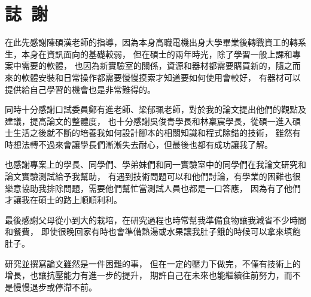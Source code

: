 \chapter*{誌~謝~}

\indent %
在此先感謝陳碩漢老師的指導，因為本身高職電機出身大學畢業後轉戰資工的轉系生，本身在資訊面向的基礎較弱，
但在碩士的兩年時光，除了學習一般上課和專案中需要的軟體，
也因為新實驗室的關係，資源和器材都需要購買新的，隨之而來的軟體安裝和日常操作都需要慢慢摸索才知道要如何使用會較好，
有器材可以提供給自己學習的機會也是非常難得的。

同時十分感謝口試委員鄭有進老師、梁郁珮老師，對於我的論文提出他們的觀點及建議，提高論文的整體度，
也十分感謝吳俊青學長和林稟宸學長，從碩一進入碩士生活之後就不斷的培養我如何設計腳本的相關知識和程式除錯的技術，
雖然有時想法轉不過來會讓學長們漸漸失去耐心，但最後也都有成功讓我了解。

也感謝專案上的學長、同學們、學弟妹們和同一實驗室中的同學們在我論文研究和論文實驗測試給予我幫助，
有遇到技術問題可以和他們討論，有學業的困難也很樂意協助我排除問題，需要他們幫忙當測試人員也都是一口答應，
因為有了他們才讓我在碩士的路上順順利利。

最後感謝父母從小到大的栽培，在研究過程也時常幫我準備食物讓我減省不少時間和餐費，
即使很晚回家有時也會準備熱湯或水果讓我肚子餓的時候可以拿來填飽肚子。

研究並撰寫論文雖然是一件困難的事，
但在一定的壓力下做完，不僅有技術上的增長，也讓抗壓能力有進一步的提升，
期許自己在未來也能繼續往前努力，而不是慢慢退步或停滯不前。